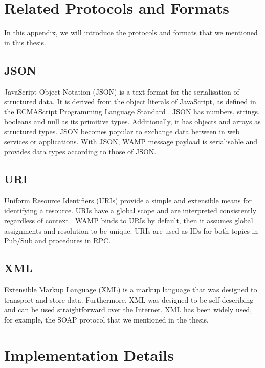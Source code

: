 \begin{appendices}
\chapter{Related Protocols and Formats}
\label{chapter:first-appendix}

In this appendix, we will introduce the protocols and formats that we mentioned in this thesis.

\section{JSON}

JavaScript Object Notation (JSON) is a text format for the serialisation of structured data. It is derived from the object literals of JavaScript, as defined in the ECMAScript Programming Language Standard \cite{crockford2006application}. JSON has numbers, strings, booleans and null as its primitive types. Additionally, it has objects and arrays as structured types. JSON becomes popular to exchange data between in web services or applications. With JSON, WAMP message payload is serialisable and provides data types according to those of JSON. 

\section{URI}

Uniform Resource Identifiers (URIs) provide a simple and extensible means for identifying a resource. URIs have a global scope and are interpreted consistently regardless of context \cite{masinter2005uniform}. WAMP binds to URIs by default, then it assumes global assignments and resolution to be unique. URIs are used as IDs for both topics in Pub/Sub and procedures in RPC. 

\section{XML}
Extensible Markup Language (XML) is a markup language that was designed to transport and store data. Furthermore, XML was designed to be self-describing and can be used straightforward over the Internet. XML has been widely used, for example, the SOAP protocol that we mentioned in the thesis. 


\chapter{Implementation Details}
\label{chapter:second-appendix}


\end{appendices}

